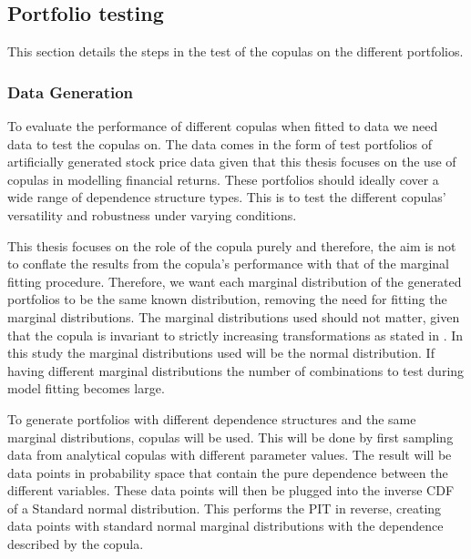 

\subsection{Portfolio testing}\label{sec:PortfolioTesting}
This section details the steps in the test of the copulas on the different portfolios. 

\subsubsection{Data Generation}
To evaluate the performance of different copulas when fitted to data we need data to test the copulas on. The data comes in the form of test portfolios of artificially generated stock price data given that this thesis focuses on the use of copulas in modelling financial returns. These portfolios should ideally cover a wide range of dependence structure types. This is to test the different copulas' versatility and robustness under varying conditions. 

This thesis focuses on the role of the copula purely and therefore, the aim is not to conflate the results from the copula's performance with that of the marginal fitting procedure. Therefore, we want each marginal distribution of the generated portfolios to be the same known distribution, removing the need for fitting the marginal distributions. The marginal distributions used should not matter, given that the copula is invariant to strictly increasing transformations as stated in . In this study the marginal distributions used will be the normal distribution. If having different marginal distributions the number of combinations to test during model fitting becomes large.  

To generate portfolios with different dependence structures and the same marginal distributions, copulas will be used. This will be done by first sampling data from analytical copulas with different parameter values. The result will be data points in probability space that contain the pure dependence between the different variables. These data points will then be plugged into the inverse \gls{CDF} of a Standard normal distribution. This performs the \gls{PIT} in reverse, creating data points with standard normal marginal distributions with the dependence described by the copula. 

